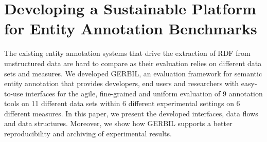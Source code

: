

\chapter{Developing a Sustainable Platform for Entity Annotation Benchmarks}




The existing entity annotation systems that drive the extraction of RDF from unstructured data are hard to compare as their evaluation relies on different data sets and measures. 
We developed GERBIL, an evaluation framework for semantic entity annotation that provides developers, end users and researchers with easy-to-use interfaces for the agile, fine-grained and uniform evaluation of 9 annotation tools on 11 different data sets within 6 different experimental settings on 6 different measures. 
In this paper, we present the developed interfaces, data flows and data structures. Moreover, we show how GERBIL supports a better reproducibility and archiving of experimental results.


